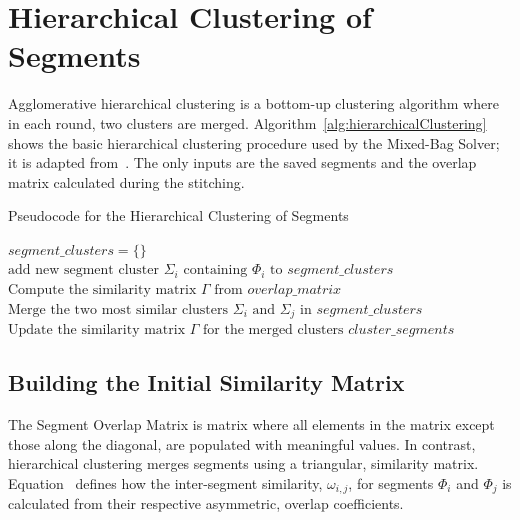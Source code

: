 \section{Hierarchical Clustering of Segments}\label{sec:hierarchicalClustering}

Agglomerative hierarchical clustering is a bottom-up clustering algorithm where in each round, two clusters are merged.  Algorithm~\ref{alg:hierarchicalClustering} shows the basic hierarchical clustering procedure used by the Mixed-Bag Solver; it is adapted from~\cite{tanIntroToDataMining}.  The only inputs are the saved segments and the overlap matrix calculated during the stitching.

\begin{algorithm}[tb]
\caption{Pseudocode for the Hierarchical Clustering of Segments}\label{alg:hierarchicalClustering}
\begin{algorithmic}[1]
	\State $\textit{segment\_clusters} = \{ \}$	
		\State $\text{add new segment cluster } \Sigma_i \text{ containing } \Phi_i \text{ to } segment\_clusters$
	\EndFor
    \State $\text{Compute the similarity matrix } \Gamma \text{ from } overlap\_matrix$
    	\State $\text{Merge the two most similar clusters } \Sigma_i \text{ and } \Sigma_j \text{ in } \textit{segment\_clusters}$
    	\State $\text{Update the similarity matrix } \Gamma \text{ for the merged clusters}$
	\EndWhile
    \State \Return $\textit{cluster\_segments}$
\EndFunction
\end{algorithmic}
\end{algorithm}

\subsection{Building the Initial Similarity Matrix}\label{sec:quantifyingSegmentSimilarity}

The Segment Overlap Matrix is matrix where all elements in the matrix except those along the diagonal, are populated with meaningful values.  In contrast, hierarchical clustering merges segments using a triangular, similarity matrix.  Equation~ defines how the inter-segment similarity, $\omega_{i,j}$, for segments $\Phi_i$ and $\Phi_j$ is calculated from their respective asymmetric, overlap coefficients.

